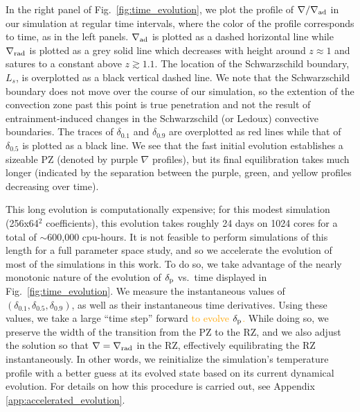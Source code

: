 \documentclass[twocolumn, linenumbers]{aastex631}
\newcommand{\gradrad}{\ensuremath{\nabla_{\rm{rad}}}}
\newcommand{\gradad}{\ensuremath{\nabla_{\rm{ad}}}}
\newcommand{\justgrad}{\ensuremath{\nabla}}
\newcommand{\delp}{\ensuremath{\delta_{\rm{p}}}}
\newcommand{\editone}[1]{\textcolor{orange}{#1}}
\begin{document}
In the right panel of Fig.~\ref{fig:time_evolution}, we plot the profile of $\justgrad/\gradad$ in our simulation at regular time intervals, where the color of the profile corresponds to time, as in the left panels.
$\gradad$ is plotted as a dashed horizontal line while $\gradrad$ is plotted as a grey solid line which decreases with height around $z \approx 1$ and satures to a constant above $z \gtrsim 1.1$.
The location of the Schwarzschild boundary, $L_s$, is overplotted as a black vertical dashed line.
We note that the Schwarzschild boundary does not move over the course of our simulation, so the extention of the convection zone past this point is true penetration and not the result of entrainment-induced changes in the Schwarzschild (or Ledoux) convective boundaries.
The traces of $\delta_{0.1}$ and $\delta_{0.9}$ are overplotted as red lines while that of $\delta_{0.5}$ is plotted as a black line.
We see that the fast initial evolution establishes a sizeable PZ (denoted by purple $\justgrad$ profiles), but its final equilibration takes much longer (indicated by the separation between the purple, green, and yellow profiles decreasing over time).

This long evolution is computationally expensive; for this modest simulation (256x64$^2$ coefficients), this evolution takes roughly 24 days on 1024 cores for a total of $\sim$600,000 cpu-hours.
It is not feasible to perform simulations of this length for a full parameter space study, and so we accelerate the evolution of most of the simulations in this work.
To do so, we take advantage of the nearly monotonic nature of the evolution of $\delp$ vs.~time displayed in Fig.~\ref{fig:time_evolution}.
We measure the instantaneous values of $(\delta_{0.1}, \delta_{0.5}, \delta_{0.9})$, as well as their instantaneous time derivatives.
Using these values, we take a large ``time step'' forward \editone{to evolve $\delp$.}
While doing so, we preserve the width of the transition from the PZ to the RZ, and we also adjust the solution so that $\justgrad = \gradrad$ in the RZ, effectively equilibrating the RZ instantaneously.
In other words, we reinitialize the simulation's temperature profile with a better guess at its evolved state based on its current dynamical evolution.
For details on how this procedure is carried out, see Appendix \ref{app:accelerated_evolution}.
\end{document}
